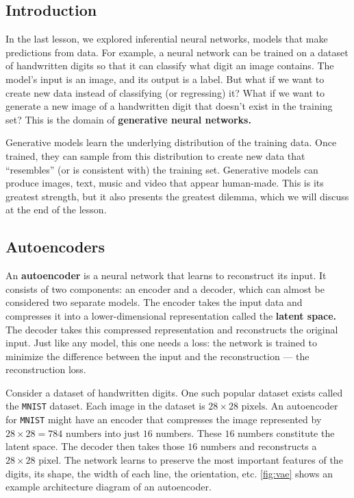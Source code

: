 \subsection*{Introduction}
In the last lesson, we explored inferential neural networks, models that make predictions from data. For example, a neural network can be trained on a dataset of handwritten digits so that it can classify what digit an image contains. The model's input is an image, and its output is a label. But what if we want to create new data instead of classifying (or regressing) it? What if we want to generate a new image of a handwritten digit that doesn't exist in the training set? This is the domain of \textbf{generative neural networks.}

Generative models learn the underlying distribution of the training data. Once trained, they can sample from this distribution to create new data that ``resembles'' (or is consistent with) the training set. Generative models can produce images, text, music and video that appear human-made. This is its greatest strength, but it also presents the greatest dilemma, which we will discuss at the end of the lesson.

\subsection*{Autoencoders}
An \textbf{autoencoder} is a neural network that learns to reconstruct its input. It consists of two components: an encoder and a decoder, which can almost be considered two separate models. The encoder takes the input data and compresses it into a lower-dimensional representation called the \textbf{latent space.} The decoder takes this compressed representation and reconstructs the original input. Just like any model, this one needs a loss: the network is trained to minimize the difference between the input and the reconstruction --- the reconstruction loss.

Consider a dataset of handwritten digits. One such popular dataset exists called the \texttt{MNIST} dataset. Each image in the dataset is $28 \times 28\text{ pixels}$. An autoencoder for \texttt{MNIST} might have an encoder that compresses the image represented by $28\times28=784\text{ numbers}$ into just $16$ numbers. These $16$ numbers constitute the latent space. The decoder then takes those $16$ numbers and reconstructs a $28 \times 28\text{ pixel}$. The network learns to preserve the most important features of the digits, \eg{} its shape, the width of each line, the orientation, etc. \autoref{fig:vae} shows an example architecture diagram of an autoencoder.

